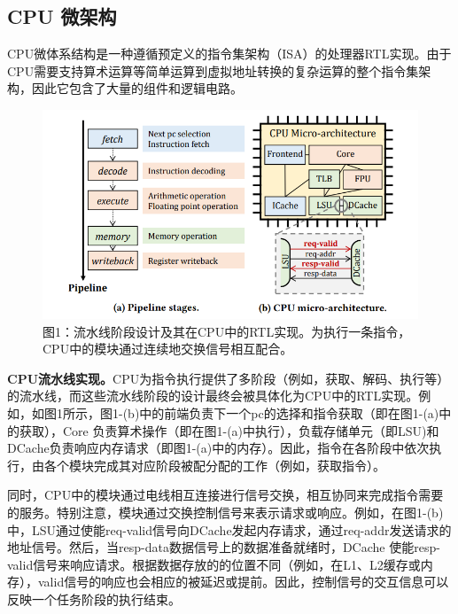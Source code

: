 \subsection{CPU 微架构}

CPU微体系结构是一种遵循预定义的指令集架构（ISA）的处理器RTL实现。由于CPU需要支持算术运算等简单运算到虚拟地址转换的复杂运算的整个指令集架构，因此它包含了大量的组件和逻辑电路。\par

\begin{figure}[!h]
    \centering
    \includegraphics[width=\linewidth]{figure/proposal/specdoctor-figure1.png}
    \caption*{图1：流水线阶段设计及其在CPU中的RTL实现。为执行一条指令，CPU中的模块通过连续地交换信号相互配合。}
\end{figure}

\textbf{CPU流水线实现。}CPU为指令执行提供了多阶段（例如，获取、解码、执行等）的流水线，而这些流水线阶段的设计最终会被具体化为CPU中的RTL实现。例如，如图1所示，图1-(b)中的前端负责下一个pc的选择和指令获取（即在图1-(a)中的获取），Core 负责算术操作（即在图1-(a)中执行），负载存储单元（即LSU)和DCache负责响应内存请求（即图1-(a)中的内存）。因此，指令在各阶段中依次执行，由各个模块完成其对应阶段被配分配的工作（例如，获取指令）。\par

同时，CPU中的模块通过电线相互连接进行信号交换，相互协同来完成指令需要的服务。特别注意，模块通过交换控制信号来表示请求或响应。例如，在图1-(b)中，LSU通过使能req-valid信号向DCache发起内存请求，通过req-addr发送请求的地址信号。然后，当resp-data数据信号上的数据准备就绪时，DCache 使能resp-valid信号来响应请求。根据数据存放的的位置不同（例如，在L1、L2缓存或内存），valid信号的响应也会相应的被延迟或提前。因此，控制信号的交互信息可以反映一个任务阶段的执行结束。\par

